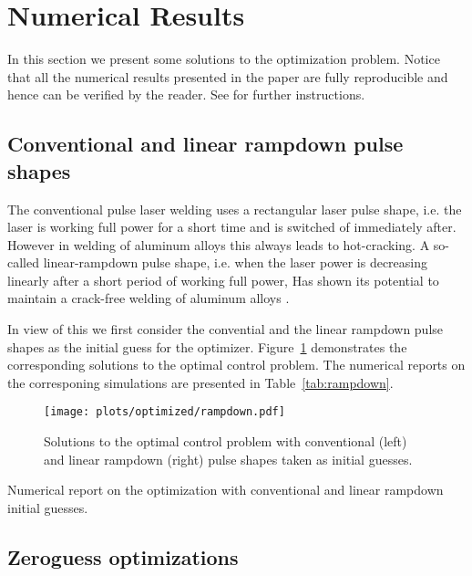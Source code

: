 \section{Numerical Results}
\label{sec:numericals}

In this section we present some solutions to the optimization problem. Notice that all the numerical results presented in the paper are fully reproducible and hence can be verified by the reader. See \cite{optcontrol_github} for further instructions. 

\subsection{Conventional and linear rampdown pulse shapes}

The conventional pulse laser welding uses a rectangular laser pulse shape, i.e. the laser is working full power for a short time and is switched of immediately after. However in welding of aluminum alloys this always leads to hot-cracking. A so-called linear-rampdown pulse shape, i.e. when the laser power is decreasing linearly after a short period of working full power, Has shown its potential to maintain a crack-free welding of aluminum alloys .

In view of this we first consider the convential and the linear rampdown pulse shapes as the initial guess for the optimizer. Figure~\ref{fig:rampdown} demonstrates the corresponding solutions to the optimal control problem. The numerical reports on the corresponing simulations are presented in Table~\ref{tab:rampdown}.

\begin{figure} \label{fig:rampdown}
	\centering
	\texttt{[image: plots/optimized/rampdown.pdf]}
	\caption{Solutions to the optimal control problem with conventional (left) and linear rampdown (right) pulse shapes taken as initial guesses.}
\end{figure}

\begin{table} \label{tab:rampdown}
	\centering
	
	\caption{Numerical report on the optimization with conventional and linear rampdown initial guesses.}
\end{table}


\subsection{Zeroguess optimizations}


